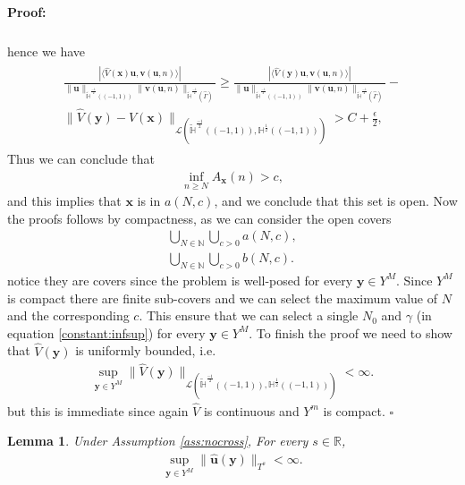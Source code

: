 \documentclass{article}
\newtheorem{lemma}[theorem]{Lemma}
\newenvironment{proof}{\paragraph{Proof:}}{\hfill$\square$}
\newcommand{\IN}{{\mathbb N}}
\newcommand{\IR}{{\mathbb R}}
\begin{document}
\begin{proof}
\begin{align*}
\end{align*}
hence we have 
\begin{align*}
\begin{split}
\frac{|\langle \widehat{V}(\mathbf{x}) \mathbf{u} , \mathbf{v}(\mathbf{u},n) \rangle|}{\| \mathbf{u} \|_{\widetilde{\mathbb{H}}^{\frac{-1}{2}}((-1,1))}
\|\mathbf{v}(\mathbf{u},n) \|_{\widetilde{\mathbb{H}}^{\frac{-1}{2}}(\widehat{\Gamma})} } \geq  
\frac{|\langle \widehat{V}(\mathbf{y}) \mathbf{u} , \mathbf{v}(\mathbf{u},n) \rangle|}{\| \mathbf{u} \|_{\widetilde{\mathbb{H}}^{\frac{-1}{2}}((-1,1))}
\|\mathbf{v}(\mathbf{u},n) \|_{\widetilde{\mathbb{H}}^{\frac{-1}{2}}(\widehat{\Gamma})} }
-  \\ \| \widehat{V}(\mathbf{y})- \widehat{V}(\mathbf{x}) \|_{\mathcal{L}(\widetilde{\mathbb{H}}^{\frac{-1}{2}}((-1,1)),{\mathbb{H}}^{\frac{1}{2}}((-1,1)))}> C +\frac{\epsilon}{2},
\end{split}
\end{align*}
Thus we can conclude that 
\begin{align*}
\inf_{n \geq N} A_{\mathbf{x}}(n) > c,
\end{align*}
and this implies that $\mathbf{x}$ is in $a(N,c)$, and we conclude that this set is open. Now the proofs follows by compactness, as we can consider the open covers
\begin{align*}
\bigcup_{N \in \IN} \bigcup_{c > 0} a(N,c),\\
\bigcup_{N \in \IN} \bigcup_{c > 0} b(N,c).
\end{align*}
notice they are covers since the problem is well-posed for every $\mathbf{y} \in Y^M$. Since $Y^M$ is compact there are finite sub-covers and we can select the maximum value of $N$ and the corresponding $c$.  This ensure that we can select a single $N_0$ and $\gamma$ (in equation \eqref{constant:infsup}) for every $\mathbf{y} \in Y^M$. To finish the proof we need to show that $\widehat{V}(\mathbf{y})$ is uniformly bounded, i.e.
\begin{align*}
\sup_{\mathbf{y} \in Y^M} \| \widehat{V}(\mathbf{y}) \|_{\mathcal{L}(\widetilde{\mathbb{H}}^{\frac{-1}{2}}((-1,1)),{\mathbb{H}}^{\frac{1}{2}}((-1,1)))} < \infty . 
\end{align*}
but this is immediate since again $\widehat{V}$ is continuous and $Y^m$ is compact.
\end{proof}

\begin{lemma}
\label{lemma:tsbound}
Under Assumption \ref{ass:nocross}, For every $s \in \IR$,
\begin{align*}
\sup_{\mathbf{y} \in Y^M}\| \widehat{\mathbf{u}}(\mathbf{y}) \|_{T^s} < \infty.
\end{align*}
\end{lemma}
\end{document}
